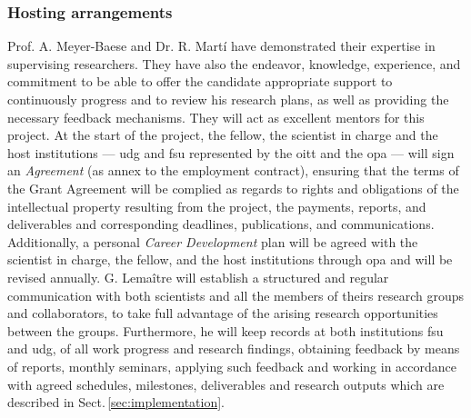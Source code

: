 

\subsubsection*{Hosting arrangements}

Prof. A. Meyer-Baese and Dr. R. Mart\'i have demonstrated their expertise in supervising researchers.
They have also the endeavor, knowledge, experience, and commitment to be able to offer the candidate appropriate support to continuously progress and to review his research plans, as well as providing the necessary feedback mechanisms.
They will act as excellent mentors for this project.
At the start of the project, the fellow, the scientist in charge and the host institutions --- \ac{udg} and \ac{fsu} represented by the \ac{oitt} and the \ac{opa} --- will sign an \emph{Agreement} (as annex to the employment contract), ensuring that the terms of the Grant Agreement will be complied as regards to rights and obligations of the intellectual property resulting from the project, the payments, reports, and deliverables and corresponding deadlines, publications, and communications.
Additionally, a personal \emph{Career Development} plan will be agreed with the scientist in charge, the fellow, and the host institutions through \ac{opa} and will be revised annually.
G. Lema\^itre will establish a structured and regular communication with both scientists and all the members of theirs research groups and collaborators, to take full advantage of the arising research opportunities between the groups.
Furthermore, he will keep records at both institutions \ac{fsu} and \ac{udg}, of all work progress and research findings, obtaining feedback by means of reports, monthly seminars, applying such feedback and working in accordance with agreed schedules, milestones, deliverables and research outputs which are described in Sect.\,\ref{sec:implementation}.

